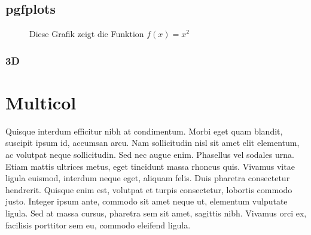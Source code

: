 \documentclass[a4paper, ngerman, oneside, 10pt]{article}
\begin{document}
\subsection{pgfplots}
\begin{figure}[!ht]
	\centering
	\caption{Diese Grafik zeigt die Funktion $f(x) = x^2$}
	\label{fig:pgf1}
\end{figure}



\subsubsection{3D}

\newpage
\section{Multicol}
\begin{multicols}{2}
	Quisque interdum efficitur nibh at condimentum. Morbi eget quam blandit, suscipit ipsum id, accumsan arcu. Nam sollicitudin nisl sit amet elit elementum, ac volutpat neque sollicitudin. Sed nec augue enim. Phasellus vel sodales urna. Etiam mattis ultrices metus, eget tincidunt massa rhoncus quis. Vivamus vitae ligula euismod, interdum neque eget, aliquam felis. Duis pharetra consectetur hendrerit. Quisque enim est, volutpat et turpis consectetur, lobortis commodo justo. Integer ipsum ante, commodo sit amet neque ut, elementum vulputate ligula. Sed at massa cursus, pharetra sem sit amet, sagittis nibh. Vivamus orci ex, facilisis porttitor sem eu, commodo eleifend ligula.
\end{multicols}
\end{document}
